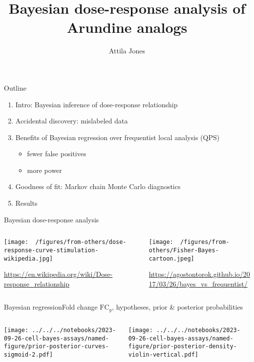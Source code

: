 \documentclass[aspectratio=169]{beamer}
\title{Bayesian dose-response analysis of Arundine analogs}
\subtitle{}
\author{Attila Jones}
\date{}
\begin{document}
\titlepage

\begin{frame}{Outline}
\begin{enumerate}
  \item Intro: Bayesian inference of dose-response relationship
  \item Accidental discovery: mislabeled data
  \item Benefits of Bayesian regression over frequentist local analysis (QPS)
  \begin{itemize}
    \item fewer false positives
    \item more power
  \end{itemize}
  \item Goodness of fit: Markov chain Monte Carlo diagnostics
  \item Results
\end{enumerate}
\end{frame}


\begin{frame}{Bayesian dose-response analysis}
\begin{columns}[t]
\begin{column}{0.5\textwidth}

\texttt{[image: ~/figures/from-others/dose-response-curve-stimulation-wikipedia.jpg]}

\tiny{\url{https://en.wikipedia.org/wiki/Dose-response\_relationship}}
\end{column}

\begin{column}{0.5\textwidth}

\texttt{[image: ~/figures/from-others/Fisher-Bayes-cartoon.jpeg]}

\tiny{\url{https://agostontorok.github.io/2017/03/26/bayes_vs_frequentist/}}
\end{column}
\end{columns}
\end{frame}

\begin{frame}{Bayesian regression}{Fold change $\mathrm{FC}_y$, hypotheses,
  prior \& posterior probabilities}
\begin{columns}[t]
\begin{column}{0.5\textwidth}

\texttt{[image: ../../../notebooks/2023-09-26-cell-bayes-assays/named-figure/prior-posterior-curves-sigmoid-2.pdf]}
\end{column}
\begin{column}{0.5\textwidth}

\texttt{[image: ../../../notebooks/2023-09-26-cell-bayes-assays/named-figure/prior-posterior-density-violin-vertical.pdf]}
\end{column}
\end{columns}
\end{frame}
\end{document}
